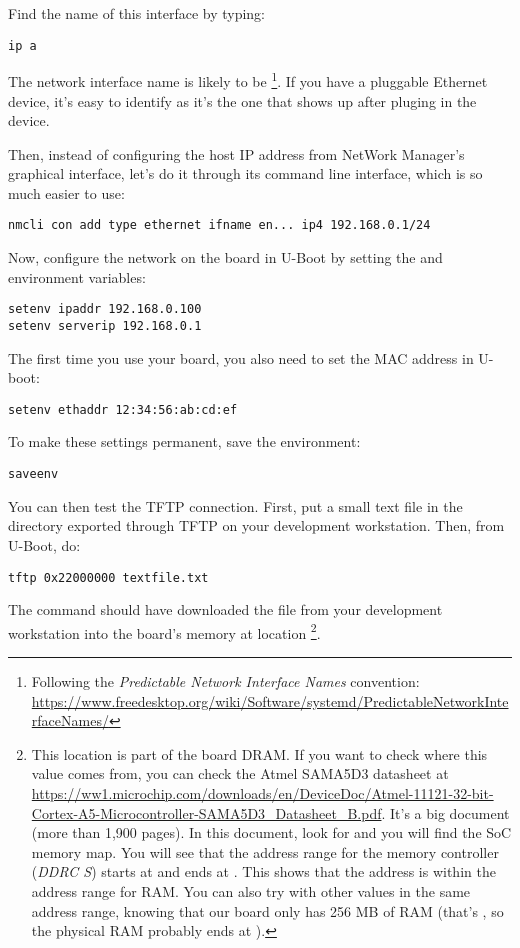 Find the name of this interface by typing:
\begin{verbatim}
ip a
\end{verbatim}

The network interface name is likely to be
\footnote{Following the {\em Predictable Network Interface
Names} convention:
\url{https://www.freedesktop.org/wiki/Software/systemd/PredictableNetworkInterfaceNames/}}.
If you have a pluggable Ethernet device, it's easy to identify as it's
the one that shows up after pluging in the device.

Then, instead of configuring the host IP address from NetWork Manager’s graphical interface,
let’s do it through its command line interface, which is so much easier to use:

\begin{verbatim}
nmcli con add type ethernet ifname en... ip4 192.168.0.1/24
\end{verbatim}

Now, configure the network on the board in U-Boot by setting the 
and  environment variables:

\begin{verbatim}
setenv ipaddr 192.168.0.100
setenv serverip 192.168.0.1
\end{verbatim}

The first time you use your board, you also need to set the MAC
address in U-boot:

\begin{verbatim}
setenv ethaddr 12:34:56:ab:cd:ef
\end{verbatim}

To make these settings permanent, save the environment:

\begin{verbatim}
saveenv
\end{verbatim}

You can then test the TFTP connection. First, put a small text file in
the directory exported through TFTP on your development
workstation. Then, from U-Boot, do:

\begin{verbatim}
tftp 0x22000000 textfile.txt
\end{verbatim}

The  command should have downloaded the
 file from your development workstation into
the board's memory at location \footnote{
This location is part of the board DRAM. If you want
to check where this value comes from, you can check the Atmel SAMA5D3
datasheet at
\url{https://ww1.microchip.com/downloads/en/DeviceDoc/Atmel-11121-32-bit-Cortex-A5-Microcontroller-SAMA5D3_Datasheet_B.pdf}.
It's a big document (more than 1,900 pages). In this document, look
for  and you will find the SoC memory map. You
will see that the address range for the memory controller ({\em DDRC
S}) starts at  and ends at . This
shows that the  address is within the address range
for RAM. You can also try with other values in the same address range,
knowing that our board only has 256 MB of RAM (that's
, so the physical RAM probably ends at
).}.

